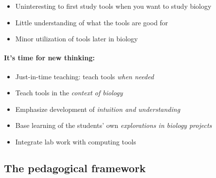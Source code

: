 \documentclass[%
twoside,                 %
final,                   %
10pt]{article}
\begin{document}
\begin{itemize}
  \item Uninteresting to first study tools when you want to study biology

  \item Little understanding of what the tools are good for

  \item Minor utilization of tools later in biology
\end{itemize}

\noindent




\paragraph{It's time for new thinking:}
\begin{itemize}
  \item Just-in-time teaching: teach tools \emph{when needed}

  \item Teach tools in the \emph{context of biology}

  \item Emphasize development of \emph{intuition and understanding}

  \item Base learning of the students' own \emph{explorations in biology projects}

  \item Integrate lab work with computing tools
\end{itemize}

\noindent




\subsection*{The pedagogical framework}


\end{document}
